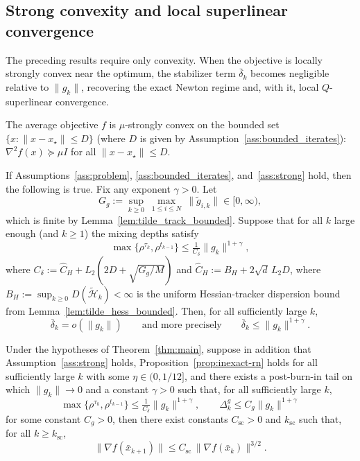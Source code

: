 \documentclass[review,onefignum,onetabnum]{siamart171218}
\begin{document}
	\subsection{Strong convexity and local superlinear convergence}\label{ssec:superlinear}
	The preceding results require only convexity.
	When the objective is locally strongly convex near the optimum,
	the stabilizer term $\bar\delta_k$ becomes negligible relative to
	$\|g_k\|$, recovering the exact Newton regime and, with it, local
	$Q$-superlinear convergence.
	
	\begin{assumption}\label{ass:strong}
		The average objective $f$ is $\mu$-strongly convex on the bounded set
		$\{x:\|x-x_\star\|\le D\}$ (where $D$ is given by
		Assumption~\ref{ass:bounded_iterates}):
		$\nabla^2 f(x)\succeq \mu I$ for all $\|x-x_\star\|\le D$.
	\end{assumption}
	
	\begin{lemma}\label{lem:delta_o_g}
		If Assumptions~\ref{ass:problem}, \ref{ass:bounded_iterates},
		and~\ref{ass:strong} hold, then the following is true.
		Fix any exponent $\gamma>0$.
		Let
		\[
		G_g:=\sup_{k\ge 0}\ \max_{1\le i\le N}\ \|\tilde g_{i,k}\|\in[0,\infty),
		\]
		which is finite by Lemma~\ref{lem:tilde_track_bounded}.
		Suppose that for all $k$ large enough (and $k\ge 1$) the mixing depths satisfy
		\begin{equation}\label{eq:delta_schedule}
			\max\{\rho^{\tau_k},\rho^{t_{k-1}}\}\le \tfrac{1}{C_\delta}\|g_k\|^{1+\gamma},
		\end{equation}
		where $C_\delta:=\hat C_H+L_2(2D+\sqrt{G_g/M})$ and $\hat C_H:=B_H+2\sqrt{d}\,L_2D$,
		where $B_H:=\sup_{k\ge0}D(\tilde{\mathcal H}_k)<\infty$
		is the uniform Hessian-tracker dispersion bound from Lemma~\ref{lem:tilde_hess_bounded}.
		Then, for all sufficiently large $k$,
		\[
		\bar\delta_k = o(\|g_k\|)\qquad\text{and more precisely}\qquad \bar\delta_k\le \|g_k\|^{1+\gamma}.
		\]
	\end{lemma}
	
	\begin{theorem}\label{thm:superlinear}
		Under the hypotheses of Theorem~\ref{thm:main}, suppose in addition
		that Assumption~\ref{ass:strong} holds,
		Proposition~\ref{prop:inexact-rn} holds for all sufficiently large $k$ with some $\eta\in(0,1/12]$,
		and there exists a post-burn-in tail on which $\|g_k\|\to0$ and
		a constant $\gamma>0$ such that, for all sufficiently large $k$,
		\begin{equation}\label{eq:local_accuracy}
			\max\{\rho^{\tau_k},\rho^{t_{k-1}}\}\le
			\tfrac{1}{C_\delta}\|g_k\|^{1+\gamma},
			\qquad
			\Delta_k^g\le C_g\|g_k\|^{1+\gamma}
		\end{equation}
		for some constant $C_g>0$,
		then there exist constants $C_{\mathrm{sc}}>0$ and $k_{\mathrm{sc}}$ such that, for all $k\ge k_{\mathrm{sc}}$,
		\[
		\|\nabla f(\bar x_{k+1})\|\le C_{\mathrm{sc}}\,\|\nabla f(\bar x_k)\|^{3/2}.
		\]
	\end{theorem}
	
\end{document}
